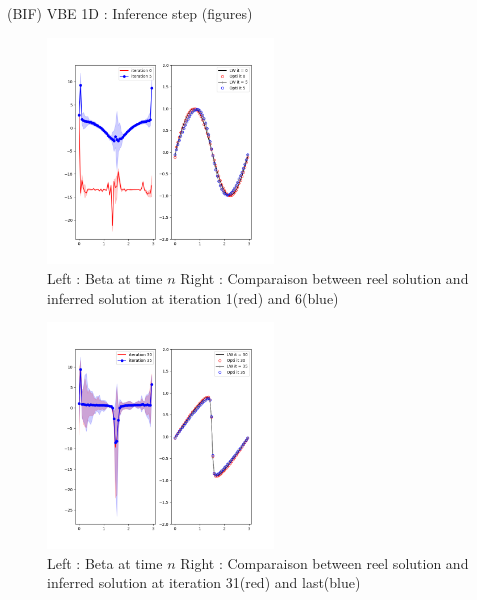 \documentclass[10pt,
			   xcolor=svgnames,
			   hyperref={linkcolor=red, citecolor = DarkGreen, colorlinks=true, urlcolor=Navy}] {beamer}
\begin{document}
\begin{frame}{(BIF) VBE 1D : Inference step (figures)}
\vspace{-1cm}
\begin{multicols}{2}
\noindent
	\begin{figure}[H]
		\centering
		\includegraphics[width = 6cm, height= 6cm]{nu0_0250_CFL0_40_Nx_52_InferenceVSTrue_it5.png}
		\vspace{-0.5cm}	
		\caption{Left : Beta at time $n$ Right : Comparaison between reel solution and inferred solution at iteration 1(red) and 6(blue)}
	\end{figure}

\columnbreak

	\begin{figure}[H]
		\centering
		\includegraphics[width = 6cm, height=6cm]{nu0_0250_CFL0_40_Nx_52_InferenceVSTrue_it35.png}
		\vspace{-0.5cm}	
		\caption{Left : Beta at time $n$ Right : Comparaison between reel solution and inferred solution at iteration 31(red) and last(blue)}
	\end{figure}

\end{multicols}

\end{frame}
\end{document}
